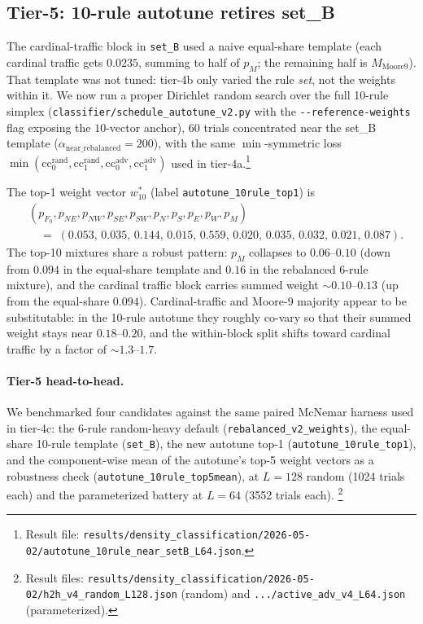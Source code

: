 \documentclass[11pt,a4paper]{article}
\newcommand{\fpath}[1]{\nolinkurl{#1}}
\begin{document}
\subsection{Tier-5: 10-rule autotune retires set\_B}
\label{subsec:tier-5}

The cardinal-traffic block in \texttt{set\_B} used a naive
equal-share template (each cardinal traffic gets \(0.0235\), summing
to half of \(p_M\); the remaining half is \(M_{\mathrm{Moore9}}\)).
That template was not tuned: tier-4b only varied the rule \emph{set},
not the weights within it.  We now run a proper Dirichlet random
search over the full 10-rule simplex
(\fpath{classifier/schedule_autotune_v2.py} with the
\fpath{--reference-weights} flag exposing the
\(10\)-vector anchor), \(60\) trials concentrated near the set\_B
template (\(\alpha_{\mathrm{near\_rebalanced}} = 200\)), with the
same \(\min\)-symmetric loss
\(\min(\mathrm{cc}_0^{\mathrm{rand}}, \mathrm{cc}_1^{\mathrm{rand}},
\mathrm{cc}_0^{\mathrm{adv}}, \mathrm{cc}_1^{\mathrm{adv}})\) used in
tier-4a.\footnote{Result file:
\fpath{results/density_classification/2026-05-02/autotune_10rule_near_setB_L64.json}.}

The top-1 weight vector
\(w^{*}_{10}\) (label \texttt{autotune\_10rule\_top1}) is
\[
\begin{aligned}
&(p_{F_0}, p_{NE}, p_{NW}, p_{SE}, p_{SW},
  p_N, p_S, p_E, p_W, p_M) \\
&\quad=\;(0.053,\, 0.035,\, 0.144,\, 0.015,\, 0.559,\,
       0.020,\, 0.035,\, 0.032,\, 0.021,\, 0.087).
\end{aligned}
\]
The top-10 mixtures share a robust pattern: \(p_M\) collapses to
\(0.06\)--\(0.10\) (down from \(0.094\) in the equal-share template
and \(0.16\) in the rebalanced 6-rule mixture), and the cardinal
traffic block carries summed weight \(\sim 0.10\)--\(0.13\) (up from
the equal-share \(0.094\)).  Cardinal-traffic and Moore-9 majority
appear to be substitutable: in the 10-rule autotune they roughly
co-vary so that their summed weight stays near \(0.18\)--\(0.20\),
and the within-block split shifts toward cardinal traffic by a
factor of \(\sim 1.3\)--\(1.7\).

\paragraph{Tier-5 head-to-head.}
{\sloppy
We benchmarked four candidates against the same paired McNemar
harness used in tier-4c: the 6-rule random-heavy default
(\texttt{rebalanced\_v2\_weights}), the equal-share 10-rule
template (\texttt{set\_B}), the new autotune top-1
(\texttt{autotune\_10rule\_top1}), and the component-wise mean of
the autotune's top-5 weight vectors as a robustness check
(\texttt{autotune\_10rule\_top5mean}), at \(L = 128\) random
(1024 trials each) and the parameterized battery at \(L = 64\)
(3552 trials each).%
\footnote{Result files:
\fpath{results/density_classification/2026-05-02/h2h_v4_random_L128.json}
(random) and \fpath{.../active_adv_v4_L64.json} (parameterized).}
\par}
\end{document}

